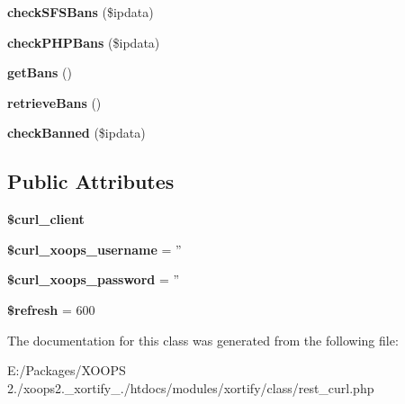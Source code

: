 \begin{DoxyCompactItemize}
\item 
\hypertarget{class_r_e_s_t___c_u_r_l_xortify_exchange_a01d982cf70a2ac0ff8c123df81cda452}{{\bfseries check\-S\-F\-S\-Bans} (\$ipdata)}\label{class_r_e_s_t___c_u_r_l_xortify_exchange_a01d982cf70a2ac0ff8c123df81cda452}

\item 
\hypertarget{class_r_e_s_t___c_u_r_l_xortify_exchange_ab4fda0a7d8d884f7bc09cd65c9ac28f8}{{\bfseries check\-P\-H\-P\-Bans} (\$ipdata)}\label{class_r_e_s_t___c_u_r_l_xortify_exchange_ab4fda0a7d8d884f7bc09cd65c9ac28f8}

\item 
\hypertarget{class_r_e_s_t___c_u_r_l_xortify_exchange_a65e828e7424e3d4ab1a8d470b7b58cc4}{{\bfseries get\-Bans} ()}\label{class_r_e_s_t___c_u_r_l_xortify_exchange_a65e828e7424e3d4ab1a8d470b7b58cc4}

\item 
\hypertarget{class_r_e_s_t___c_u_r_l_xortify_exchange_a5f580a21abfbbe9acc0e8839c3b65bbe}{{\bfseries retrieve\-Bans} ()}\label{class_r_e_s_t___c_u_r_l_xortify_exchange_a5f580a21abfbbe9acc0e8839c3b65bbe}

\item 
\hypertarget{class_r_e_s_t___c_u_r_l_xortify_exchange_aef548f74191c3907685135d4e82c1f4d}{{\bfseries check\-Banned} (\$ipdata)}\label{class_r_e_s_t___c_u_r_l_xortify_exchange_aef548f74191c3907685135d4e82c1f4d}

\end{DoxyCompactItemize}
\subsection*{Public Attributes}
\begin{DoxyCompactItemize}
\item 
\hypertarget{class_r_e_s_t___c_u_r_l_xortify_exchange_a49a84b937616a2a6ab188c926bd0bc0b}{{\bfseries \$curl\-\_\-client}}\label{class_r_e_s_t___c_u_r_l_xortify_exchange_a49a84b937616a2a6ab188c926bd0bc0b}

\item 
\hypertarget{class_r_e_s_t___c_u_r_l_xortify_exchange_adef13c1d635af3f4bd70cc84a3f21f1c}{{\bfseries \$curl\-\_\-xoops\-\_\-username} = ''}\label{class_r_e_s_t___c_u_r_l_xortify_exchange_adef13c1d635af3f4bd70cc84a3f21f1c}

\item 
\hypertarget{class_r_e_s_t___c_u_r_l_xortify_exchange_a2f97c105d275b8ed4479abb810497def}{{\bfseries \$curl\-\_\-xoops\-\_\-password} = ''}\label{class_r_e_s_t___c_u_r_l_xortify_exchange_a2f97c105d275b8ed4479abb810497def}

\item 
\hypertarget{class_r_e_s_t___c_u_r_l_xortify_exchange_a2abe4660e5d19ce2ce2631b312f8b6b8}{{\bfseries \$refresh} = 600}\label{class_r_e_s_t___c_u_r_l_xortify_exchange_a2abe4660e5d19ce2ce2631b312f8b6b8}

\end{DoxyCompactItemize}


The documentation for this class was generated from the following file\-:\begin{DoxyCompactItemize}
\item 
E\-:/\-Packages/\-X\-O\-O\-P\-S 2./xoops2.\-\_\-xortify\-\_./htdocs/modules/xortify/class/rest\-\_\-curl.\-php\end{DoxyCompactItemize}
